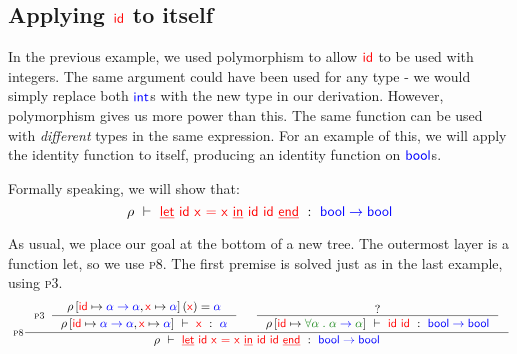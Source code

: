 \documentclass[a4paper]{article}
\newcommand{\RULE}[1]{\textsc{#1}}
\newcommand{\kwd}[1]{\ensuremath{\mathsf{\textcolor{term}{\underline{#1}}}}}
\newcommand{\expr}[1]{\ensuremath{\textcolor{term}{#1}}}
\newcommand{\type}[1]{\ensuremath{\textcolor{blue}{#1}}}
\newcommand{\context}[1]{\ensuremath{\textcolor{black}{#1}}}
\newcommand{\scheme}[1]{\ensuremath{\textcolor{ForestGreen}{#1}}}
\newcommand{\const}[1]{\mathsf{#1}}
\newcommand{\typing}[3]{\ensuremath{#1\ \vdash\ #2\ :\ #3}}
\newcommand\var[1]{\ensuremath{\expr{\mathsf{#1}}}}
\newcommand{\app}[2]{#1\ #2}
\newcommand{\LETF}[4]{\kwd{let}\ #1\ #2\ \textcolor{term}{=}\ #3\ \kwd{in}\ #4\ \kwd{end}}
\newcommand\INT{\type{\const{int}}}
\newcommand\BOOL{\type{\const{bool}}}
\newcommand{\fn}[2]{#1\;\type{\to}\;#2}
\newcommand\FORALL[2]{\scheme{\forall #1\;.\;#2}}
\newcommand{\WITH}[2]{\context{#1\left[#2\right]}}
\newcommand{\RHO}{\context{\rho}}
\newcommand{\LOOKUP}[2]{#1\left(#2\right)}
\begin{document}
\subsection{Applying \var{id} to itself}
\label{sec:apply-varid-itself}

In the previous example, we used polymorphism to allow \var{id} to be used
with integers.  The same argument could have been used for any type - we would
simply replace both \INT s with the new type in our derivation. However,
polymorphism gives us more power than this.  The same function can be used
with \emph{different} types in the same expression. For an example of this, we
will apply the identity function to itself, producing an identity function on
\BOOL s.

Formally speaking, we will show that:
\begin{displaymath}
  \typing{\RHO}{\LETF{\var{id}}{\var{x}}{\var{x}}{\app{\var{id}}{\var{id}}}}{\fn{\BOOL}{\BOOL}}
\end{displaymath}

As usual, we place our goal at the bottom of a new tree.  The outermost layer
is a function let, so we use \RULE{p8}.  The first premise is solved just as
in the last example, using \RULE{p3}.
\begin{displaymath}
\resizebox{1.10\textwidth}{!}{
  \inference[\RULE{p8}]{
    \inference[\RULE{p3}]{
      \LOOKUP{
        \WITH{\RHO}{\var{id}\mapsto \fn{\type{\alpha}}{\type{\alpha}}, \var{x} \mapsto \type{\alpha}}
      }{\var{x}}
      = \type{\alpha}
    }{
      \typing{
        \WITH{\RHO}{\var{id}\mapsto \fn{\type{\alpha}}{\type{\alpha}}, \var{x} \mapsto \type{\alpha}}
      }{
        \var{x}
      }{
        \type{\alpha}
      }
    }
    &
    \inference{?}{
      \typing{
        \WITH{\RHO}{\var{id}\mapsto\FORALL{\scheme{\alpha}}{\fn{\scheme{\alpha}}{\scheme{\alpha}}}}
      }{
        \app{\var{id}}{\var{id}}
      }{
        \fn{\BOOL}{\BOOL}
      }
    }
  }{
    \typing{\RHO}{\LETF{\var{id}}{\var{x}}{\var{x}}{\app{\var{id}}{\var{id}}}}{\fn{\BOOL}{\BOOL}}
  }
}
\end{displaymath}
\end{document}
